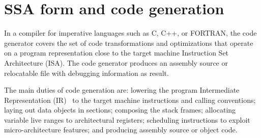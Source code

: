 \chapter{SSA form and code generation }
\label{chapter:ssa-codegen}

In a compiler for imperative languages such as C, C++, or FORTRAN, the code
generator covers the set of code transformations and optimizations that operate
on a program representation close to the target machine Instruction Set
Architecture (ISA). The code generator produces an
assembly source or relocatable file with debugging information as result.

The main duties of code generation are: lowering the program Intermediate
Representation (IR)~\cite{Stanier:2013:CS} to the target machine instructions and calling conventions;
laying out data objects in sections; composing the stack frames; allocating
variable live ranges to architectural registers; scheduling instructions to
exploit micro-architecture features; and producing assembly source or object code.

